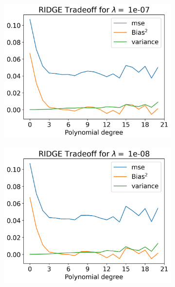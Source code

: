 \documentclass[12pt]{article}
\begin{document}
\begin{figure}[H]
  \begin{subfigure}{.5\textwidth}
    \centering
    \includegraphics[width=\textwidth]{../figures/tradeoff_RIDGE_1e-07_20.png}
    \caption{}
    \label{fig:l_1e-07}
  \end{subfigure}
  \begin{subfigure}{.5\textwidth}
    \centering
    \includegraphics[width=\textwidth]{../figures/tradeoff_RIDGE_1e-08_20.png}
    \caption{}
    \label{fig:l_1e-08}
  \end{subfigure}
  \begin{subfigure}{.5\textwidth}

\end{subfigure}
\end{figure}
\end{document}
